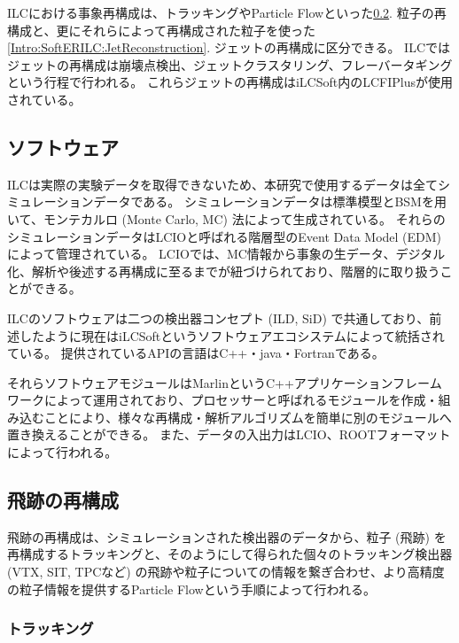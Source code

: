 ILCにおける事象再構成は、トラッキングやParticle Flowといった\ref{Intro:SoftERILC:ParticleReconstruction}. 粒子の再構成と、更にそれらによって再構成された粒子を使った\ref{Intro:SoftERILC:JetReconstruction}. ジェットの再構成に区分できる。
ILCではジェットの再構成は崩壊点検出、ジェットクラスタリング、フレーバータギングという行程で行われる。
これらジェットの再構成はiLCSoft内のLCFIPlus\cite{LCFIPlus}が使用されている。


\subsection{ソフトウェア} \label{Intro:SoftERILC:Software}

ILCは実際の実験データを取得できないため、本研究で使用するデータは全てシミュレーションデータである。
シミュレーションデータは標準模型とBSMを用いて、モンテカルロ (Monte Carlo, MC) 法によって生成されている。
それらのシミュレーションデータはLCIOと呼ばれる階層型のEvent Data Model (EDM) によって管理されている。
LCIOでは、MC情報から事象の生データ、デジタル化、解析や後述する再構成に至るまでが紐づけられており、階層的に取り扱うことができる。

ILCのソフトウェアは二つの検出器コンセプト (ILD, SiD) で共通しており、前述したように現在はiLCSoftというソフトウェアエコシステムによって統括されている。
提供されているAPIの言語はC++・java・Fortranである。

それらソフトウェアモジュールはMarlin\cite{Marlinpaper}というC++アプリケーションフレームワークによって運用されており、プロセッサーと呼ばれるモジュールを作成・組み込むことにより、様々な再構成・解析アルゴリズムを簡単に別のモジュールへ置き換えることができる。
また、データの入出力はLCIO、ROOTフォーマットによって行われる。


\subsection{飛跡の再構成} \label{Intro:SoftERILC:ParticleReconstruction}

飛跡の再構成は、シミュレーションされた検出器のデータから、粒子 (飛跡) を再構成するトラッキングと、そのようにして得られた個々のトラッキング検出器 (VTX, SIT, TPCなど) の飛跡や粒子についての情報を繋ぎ合わせ、より高精度の粒子情報を提供するParticle Flowという手順によって行われる。

\subsubsection{トラッキング}

